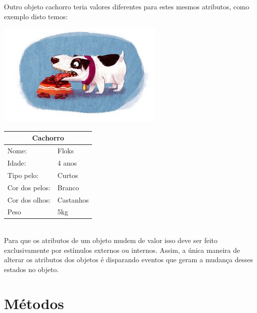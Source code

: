   Outro objeto cachorro teria valores diferentes para estes mesmos atributos, como exemplo disto temos:

  \begin{minipage}{\textwidth}
    \begin{minipage}[b]{0.49\textwidth}
      \centering
      \includegraphics[scale=0.6]{imagens/cachorro-objeto-2.png}
      \label{fig:cachorro-objeto-2}
    \end{minipage}
    \hfill
    \begin{minipage}[b]{0.49\textwidth}
      \centering
      \begin{tabular}{|l|l|}
        \hline
        \multicolumn{2}{|c|}{Cachorro}      \\ \hline
          Nome:                 & Floks     \\ \hline
          Idade:                & 4 anos    \\ \hline
          Tipo pelo:            & Curtos    \\ \hline
          Cor dos pelos:        & Branco    \\ \hline
          Cor dos olhos:        & Castanhos \\ \hline
          Peso                  & 5kg       \\ \hline
        \end{tabular}
      \end{minipage}
    \end{minipage} \\ 

Para que os atributos de um objeto mudem de valor isso deve ser feito  exclusivamente por estímulos externos ou internos. Assim, a única maneira  de alterar os atributos dos objetos é disparando eventos que geram a mudança desses estados no objeto.

\section{Métodos}

